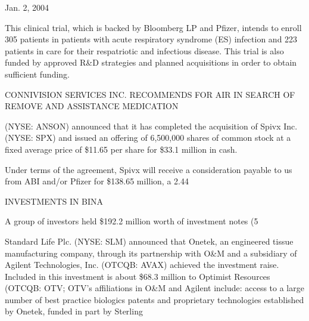 \documentclass{article}
\begin{document}
Jan. 2, 2004

This clinical trial, which is backed by Bloomberg LP and Pfizer, intends to enroll 305 patients in patients with acute respiratory syndrome (ES) infection and 223 patients in care for their respatriotic and infectious disease. This trial is also funded by approved R\&D strategies and planned acquisitions in order to obtain sufficient funding.

CONNIVISION SERVICES INC. RECOMMENDS FOR AIR IN SEARCH OF REMOVE AND ASSISTANCE MEDICATION

(NYSE: ANSON) announced that it has completed the acquisition of Spivx Inc. (NYSE: SPX) and issued an offering of 6,500,000 shares of common stock at a fixed average price of \$11.65 per share for \$33.1 million in cash.

Under terms of the agreement, Spivx will receive a consideration payable to us from ABI and/or Pfizer for \$138.65 million, a 2.44%

INVESTMENTS IN BINA

A group of investors held \$192.2 million worth of investment notes (5%

Standard Life Plc. (NYSE: SLM) announced that Onetek, an engineered tissue manufacturing company, through its partnership with O\&M and a subsidiary of Agilent Technologies, Inc. (OTCQB: AVAX) achieved the investment raise. Included in this investment is about \$68.3 million to Optimist Resources (OTCQB: OTV; OTV's affiliations in O\&M and Agilent include: access to a large number of best practice biologics patents and proprietary technologies established by Onetek, funded in part by Sterling 
\end{document}
